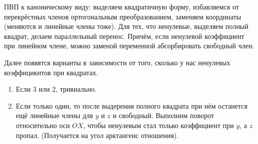 \documentclass[12pt, a4paper]{article}
\begin{document}
ПВП к каноническому виду: выделяем квадратичную форму, избавляемся от перекрёстных членов ортогональным преобразованием, заменяем координаты (меняются и линейные члены тоже).
Для тех, что ненулевые, выделяем полный квадрат, делаем параллельный перенос. Причём, если ненулевой коэффициент при линейном члене, можно заменой переменной абсорбировать свободный член.

Далее появятся варианты в зависимости от того, сколько у нас ненулевых коэффицикнтов при квадратах.

\begin{enumerate}
    \item Если 3 или 2, тривиально.
    \item Если только один, то после выдерения полного квадрата при нём останется ещё линейные члены для $y$ и $z$ и свободный. 
    Выполним поворот относительно оси $OX$, чтобы ненулевым стал только коэффициент при $y$, а $z$ пропал. (Получается на угол арктангенс отношения).
\end{enumerate}
\end{document}
